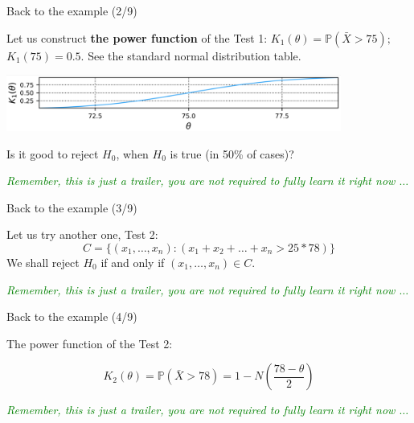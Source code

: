 \documentclass{beamer}
\begin{document}
\begin{frame}
{\centerline{Back to the example (2/9)}}


Let us construct \textbf{the power function} of the Test 1: $K_{1}(\theta) = \mathbb{P}(\bar{X}>75);$   $K_1(75) = 0.5.$ 
See the standard normal distribution table.
\begin{center}
  
\includegraphics[width=11cm]{A2022.IDSEPC.SperimentazioneDeduzione/k1.png}
\end{center}

Is it good to reject $H_0$, when $H_0$ is true (in 50\% of cases)?

\vspace*{1cm}
\begin{center}
\textcolor{green}{\textit{Remember, this is just a trailer, you are not required to fully learn it right now $\ldots{}$}}
\end{center}

\end{frame}



\begin{frame}
{\centerline{Back to the example (3/9)}}
Let us try another one, Test 2:
$$C = \{ (x_1,\ldots, x_n): (x_1 + x_2 + \ldots + x_n > 25*78) \}$$
We shall reject $H_0$ if and only if $(x_1,\ldots, x_n) \in C$.

\vspace*{1.5cm}
\begin{center}
\textcolor{green}{\textit{Remember, this is just a trailer, you are not required to fully learn it right now $\ldots{}$}}
\end{center}

\end{frame}



\begin{frame}
{\centerline{Back to the example (4/9)}}

The power function of the Test 2: 

$$K_{2}(\theta) = \mathbb{P}(\bar{X}>78) = 1 - N\left(\frac{78-\theta}{2}\right)$$

\vspace*{1.5cm}
\begin{center}
\textcolor{green}{\textit{Remember, this is just a trailer, you are not required to fully learn it right now $\ldots{}$}}
\end{center}

\end{frame}
\end{document}
